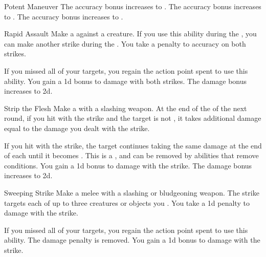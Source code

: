 {\begin{ability}{Potent Maneuver}
                \rankline
                 The accuracy bonus increases to .
                 The accuracy bonus increases to .
                 The accuracy bonus increases to .
            \end{ability}

            \begin{ability}{Rapid Assault}
                Make a  against a creature.
                If you use this ability during the , you can make another strike during the .
                You take a  penalty to accuracy on both strikes.

                \rankline
                 If you missed all of your targets, you regain the action point spent to use this ability.
                 You gain a \plus1d bonus to damage with both strikes.
                 The damage bonus increases to \plus2d.
            \end{ability}

            \begin{ability}{Strip the Flesh}
                Make a  with a slashing weapon.
                At the end of the  of the next round, if you hit with the strike and the target is not , it takes additional damage equal to the damage you dealt with the strike.

                \rankline
                 If you hit with the strike, the target continues taking the same damage at the end of each  until it becomes .
                This is a , and can be removed by abilities that remove conditions.
                 You gain a \plus1d bonus to damage with the strike.
                 The damage bonus increases to \plus2d.
            \end{ability}

            \begin{ability}{Sweeping Strike}
                Make a melee  with a slashing or bludgeoning weapon.
                The strike targets each of up to three creatures or objects you .
                You take a \minus1d penalty to damage with the strike.

                \rankline
                 If you missed all of your targets, you regain the action point spent to use this ability.
                 The damage penalty is removed.
                 You gain a \plus1d bonus to damage with the strike.
            \end{ability}
        }

